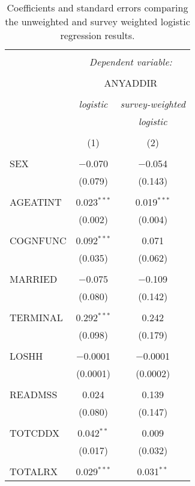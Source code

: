 \documentclass{article}
\begin{document}
\begin{appendix}
\begin{table}[h] \centering 
  \caption{Coefficients and standard errors comparing the unweighted and survey weighted logistic regression results.} 
  \label{} 
\begin{tabular}{@{\extracolsep{5pt}}lcc} 
\\[-1.8ex]\hline 
\hline \\[-1.8ex] 
 & \multicolumn{2}{c}{\textit{Dependent variable:}} \\ 
\cline{2-3} 
\\[-1.8ex] & \multicolumn{2}{c}{ANYADDIR} \\ 
\\[-1.8ex] & \textit{logistic} & \textit{survey-weighted} \\ 
 & \textit{} & \textit{logistic} \\ 
\\[-1.8ex] & (1) & (2)\\ 
\hline \\[-1.8ex] 
 SEX & $-$0.070 & $-$0.054 \\ 
  & (0.079) & (0.143) \\ 
  & & \\ 
 AGEATINT & 0.023$^{***}$ & 0.019$^{***}$ \\ 
  & (0.002) & (0.004) \\ 
  & & \\ 
 COGNFUNC & 0.092$^{***}$ & 0.071 \\ 
  & (0.035) & (0.062) \\ 
  & & \\ 
 MARRIED & $-$0.075 & $-$0.109 \\ 
  & (0.080) & (0.142) \\ 
  & & \\ 
 TERMINAL & 0.292$^{***}$ & 0.242 \\ 
  & (0.098) & (0.179) \\ 
  & & \\ 
 LOSHH & $-$0.0001 & $-$0.0001 \\ 
  & (0.0001) & (0.0002) \\ 
  & & \\ 
 READMSS & 0.024 & 0.139 \\ 
  & (0.080) & (0.147) \\ 
  & & \\ 
 TOTCDDX & 0.042$^{**}$ & 0.009 \\ 
  & (0.017) & (0.032) \\ 
  & & \\ 
 TOTALRX & 0.029$^{***}$ & 0.031$^{**}$ \\ 

\end{tabular}
\end{table}
\end{appendix}
\end{document}
